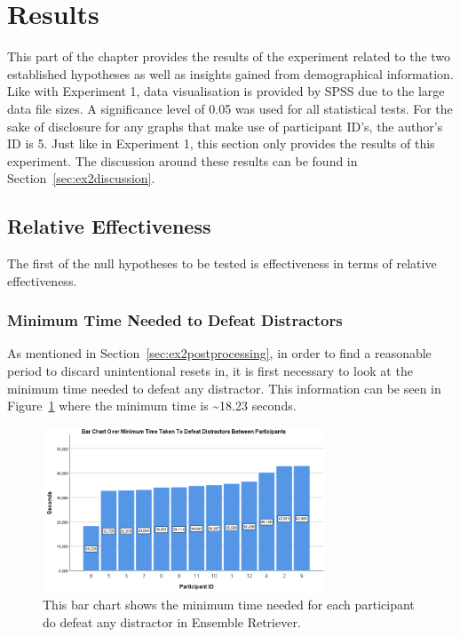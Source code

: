 \section{Results}
This part of the chapter provides the results of the experiment related to the two established hypotheses as well as insights gained from demographical information. Like with Experiment 1, data visualisation is provided by SPSS due to the large data file sizes. A significance level of 0.05 was used for all statistical tests. For the sake of disclosure for any graphs that make use of participant ID's, the author's ID is 5. Just like in Experiment 1, this section only provides the results of this experiment. The discussion around these results can be found in Section~\ref{sec:ex2discussion}.

\subsection{Relative Effectiveness}
The first of the null hypotheses to be tested is effectiveness in terms of relative effectiveness. 

\subsubsection{Minimum Time Needed to Defeat Distractors}
As mentioned in Section~\ref{sec:ex2postprocessing}, in order to find a reasonable period to discard unintentional resets in, it is first necessary to look at the minimum time needed to defeat any distractor. This information can be seen in Figure~\ref{fig:minDistractorDefeatTime} where the minimum time is \textasciitilde18.23 seconds.

\begin{figure}[tbph]
    \centering
    \includegraphics[width=0.75\textwidth]{figures/graphs/MinDistractorDefeatTime.png}
    \caption[Minimum Time Needed To Defeat Distractors Between Participants]{This bar chart shows the minimum time needed for each participant do defeat any distractor in Ensemble Retriever.}
    \label{fig:minDistractorDefeatTime}
\end{figure}

